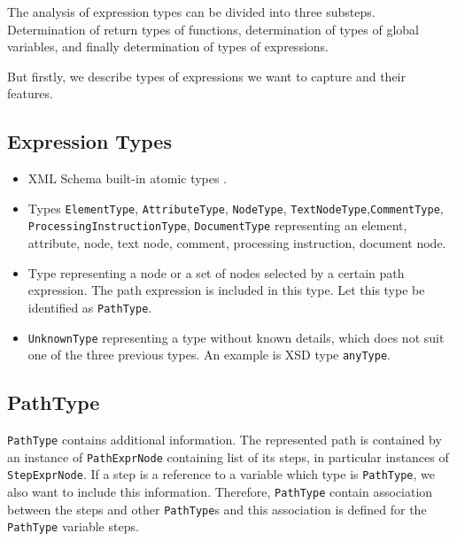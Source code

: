 
The analysis of expression types can be divided into three substeps. Determination of return types of functions, determination of types of global variables, and finally determination of types of expressions.

But firstly, we describe types of expressions we want to capture and their features.

\subsection{Expression Types}

\begin{itemize}
\item XML Schema built-in atomic types .
\item Types \texttt{ElementType}, \texttt{AttributeType}, \texttt{NodeType}, \texttt{TextNodeType},\linebreak \texttt{CommentType}, \texttt{ProcessingInstructionType}, \texttt{DocumentType} representing an element, attribute, node, text node, comment, processing instruction, document node.
\item Type representing a node or a set of nodes selected by a certain path expression. The path expression is included in this type. Let this type be identified as \texttt{PathType}.
\item \texttt{UnknownType} representing a type without known details, which does not suit one of the three previous types. An example is XSD type \texttt{anyType}.
\end{itemize}

\subsection{PathType}
\texttt{PathType} contains additional information. The represented path is contained by an instance of \texttt{PathExprNode} containing list of its steps, in particular instances of \texttt{StepExprNode}. If a step is a reference to a variable which type is \texttt{PathType}, we also want to include this information. Therefore, \texttt{PathType} contain association between the steps and other \texttt{PathType}s and this association is defined for the \texttt{PathType} variable steps.

